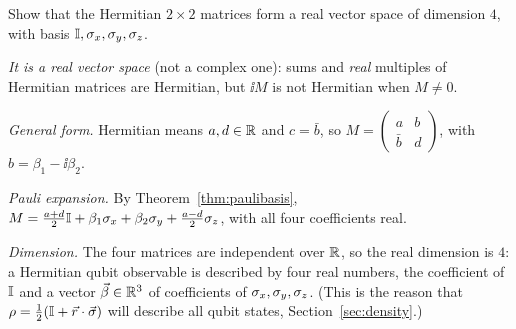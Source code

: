 \begin{example}\label{ex:hermitian-dim}
  Show that the Hermitian $2\times2$ matrices form a real vector space of dimension $4$, with basis $\mathbb{I},\sigma_x,\sigma_y,\sigma_z$.
\end{example}
\begin{solution}
  \begin{steps}
    \item \emph{It is a real vector space} (not a complex one): sums and \emph{real} multiples of Hermitian matrices are Hermitian, but $\ii M$ is not Hermitian when $M\neq0$.
    \item \emph{General form.} Hermitian means $a,d\in\mathbb{R}$ and $c=\bar b$, so $M=\begin{pmatrix}a&b\\\bar b&d\end{pmatrix}$, with $b=\beta_1-\ii\beta_2$.
    \item \emph{Pauli expansion.} By Theorem~\ref{thm:paulibasis}, $M=\tfrac{a+d}2\mathbb{I}+\beta_1\sigma_x+\beta_2\sigma_y+\tfrac{a-d}2\sigma_z$, with all four coefficients real.
    \item \emph{Dimension.} The four matrices are independent over $\mathbb{R}$, so the real dimension is $4$: a Hermitian qubit observable is described by four real numbers, the coefficient of $\mathbb{I}$ and a vector $\vec\beta\in\mathbb{R}^3$ of coefficients of $\sigma_x,\sigma_y,\sigma_z$. (This is the reason that $\rho=\tfrac12(\mathbb{I}+\vec r\cdot\vec\sigma)$ will describe all qubit states, Section~\ref{sec:density}.)
  \end{steps}
\end{solution}

